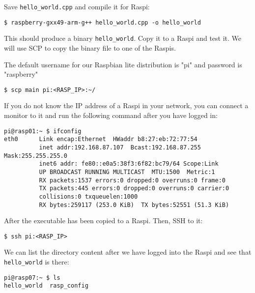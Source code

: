 Save \texttt{hello\_world.cpp} and compile it for \ac{Raspi}:

\begin{lstlisting}[]
$ raspberry-gxx49-arm-g++ hello_world.cpp -o hello_world
\end{lstlisting}
\FloatBarrier
\vspace{-5mm}

This should produce a binary \texttt{hello\_world}. Copy it to a \ac{Raspi}
and test it. We will use \ac{SCP} to copy the binary file to one of the \ac{Raspi}s.

The default username for our Raspbian lite distribution is "pi" and password is "raspberry"

\begin{lstlisting}[]
$ scp main pi:<RASP_IP>:~/
\end{lstlisting}
\FloatBarrier
\vspace{-5mm}

If you do not know the \ac{IP} address of a \ac{Raspi} in your network, you can
connect a monitor to it and run the following command after you have logged in:
\begin{lstlisting}[]
pi@rasp01:~ $ ifconfig
eth0      Link encap:Ethernet  HWaddr b8:27:eb:72:77:54  
          inet addr:192.168.87.107  Bcast:192.168.87.255  Mask:255.255.255.0
          inet6 addr: fe80::e0a5:38f3:6f82:bc79/64 Scope:Link
          UP BROADCAST RUNNING MULTICAST  MTU:1500  Metric:1
          RX packets:1537 errors:0 dropped:0 overruns:0 frame:0
          TX packets:445 errors:0 dropped:0 overruns:0 carrier:0
          collisions:0 txqueuelen:1000 
          RX bytes:259117 (253.0 KiB)  TX bytes:52551 (51.3 KiB)

\end{lstlisting}
\FloatBarrier
\vspace{-5mm}

After the executable has been copied to a \ac{Raspi}. Then, \ac{SSH} to it:

\begin{lstlisting}[]
$ ssh pi:<RASP_IP>
\end{lstlisting}
\FloatBarrier
\vspace{-5mm}

We can list the directory content after we have logged into the \ac{Raspi} and
see that \texttt{hello\_world} is there:

\begin{lstlisting}[]
pi@rasp07:~ $ ls
hello_world  rasp_config
\end{lstlisting}
\FloatBarrier
\vspace{-5mm}

